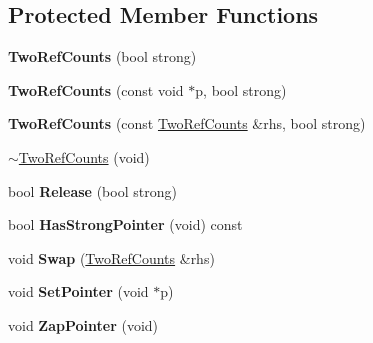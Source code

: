 \subsection*{Protected Member Functions}
\begin{DoxyCompactItemize}
\item 
\hypertarget{classLoki_1_1TwoRefCounts_a1e53ed9506d10a15181c0065711f2693}{}{\bfseries Two\+Ref\+Counts} (bool strong)\label{classLoki_1_1TwoRefCounts_a1e53ed9506d10a15181c0065711f2693}

\item 
\hypertarget{classLoki_1_1TwoRefCounts_a8005bffa80d74701cfa98bf58d91b019}{}{\bfseries Two\+Ref\+Counts} (const void $\ast$p, bool strong)\label{classLoki_1_1TwoRefCounts_a8005bffa80d74701cfa98bf58d91b019}

\item 
\hypertarget{classLoki_1_1TwoRefCounts_ae4aaffe6aedd9dedcd5b6b6a325cb1b6}{}{\bfseries Two\+Ref\+Counts} (const \hyperlink{classLoki_1_1TwoRefCounts}{Two\+Ref\+Counts} \&rhs, bool strong)\label{classLoki_1_1TwoRefCounts_ae4aaffe6aedd9dedcd5b6b6a325cb1b6}

\item 
\hyperlink{classLoki_1_1TwoRefCounts_a66b5b302258aae61996f43fd4d541440}{$\sim$\+Two\+Ref\+Counts} (void)
\item 
\hypertarget{classLoki_1_1TwoRefCounts_adb9a516b17e64cb29d0b9294cfb1e9cf}{}bool {\bfseries Release} (bool strong)\label{classLoki_1_1TwoRefCounts_adb9a516b17e64cb29d0b9294cfb1e9cf}

\item 
\hypertarget{classLoki_1_1TwoRefCounts_ac129a26034b6f36044c1f3c4a3d7b634}{}bool {\bfseries Has\+Strong\+Pointer} (void) const \label{classLoki_1_1TwoRefCounts_ac129a26034b6f36044c1f3c4a3d7b634}

\item 
\hypertarget{classLoki_1_1TwoRefCounts_a4f50b12ccb22f5f42985b22fd93a3b6e}{}void {\bfseries Swap} (\hyperlink{classLoki_1_1TwoRefCounts}{Two\+Ref\+Counts} \&rhs)\label{classLoki_1_1TwoRefCounts_a4f50b12ccb22f5f42985b22fd93a3b6e}

\item 
\hypertarget{classLoki_1_1TwoRefCounts_a4d02443f83c301f03f08f9476bc8d1f7}{}void {\bfseries Set\+Pointer} (void $\ast$p)\label{classLoki_1_1TwoRefCounts_a4d02443f83c301f03f08f9476bc8d1f7}

\item 
\hypertarget{classLoki_1_1TwoRefCounts_a4faa54faf825b8c53e33ebd7a279e7d8}{}void {\bfseries Zap\+Pointer} (void)\label{classLoki_1_1TwoRefCounts_a4faa54faf825b8c53e33ebd7a279e7d8}


\end{DoxyCompactItemize}

